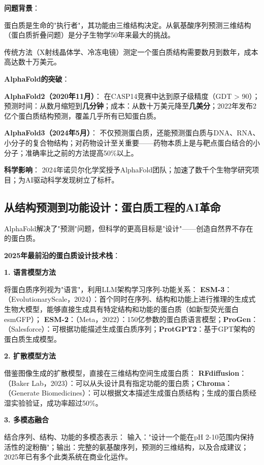 \textbf{问题背景}：

蛋白质是生命的"执行者"，其功能由三维结构决定。从氨基酸序列预测三维结构（蛋白质折叠问题）是分子生物学50年来最大的挑战。

传统方法（X射线晶体学、冷冻电镜）测定一个蛋白质结构需要数月到数年，成本高达数十万美元。

\textbf{AlphaFold的突破}：

\textbf{AlphaFold2（2020年11月）}\cite{jumper2021highly}：
在CASP14竞赛中达到原子级精度（GDT > 90）；预测时间：从数月缩短到\textbf{几分钟}；成本：从数十万美元降至\textbf{几美分}；2022年发布2亿个蛋白质结构预测，覆盖几乎所有已知蛋白质。

\textbf{AlphaFold3（2024年5月）}：
不仅预测蛋白质，还能预测蛋白质与DNA、RNA、小分子的复合物结构；对药物设计至关重要——药物本质上是与靶点蛋白结合的小分子；准确率比之前的方法提高50\%以上。

\textbf{科学影响}：
2024年诺贝尔化学奖授予AlphaFold团队；加速了数千个生物学研究项目；为AI驱动科学发现树立了标杆。

\subsection{从结构预测到功能设计：蛋白质工程的AI革命}

AlphaFold解决了"预测"问题，但科学的更高目标是"设计"——创造自然界不存在的蛋白质。

\textbf{2025年最前沿的蛋白质设计技术栈}：

\textbf{1. 语言模型方法}

将蛋白质序列视为"语言"，利用LLM架构学习序列-功能关系：
\textbf{ESM-3}：\allowbreak （EvolutionaryScale，2024）：首个同时在序列、结构和功能上进行推理的生成式生物大模型，能够直接生成具有特定结构和功能的蛋白质（如新型荧光蛋白esmGFP）；\allowbreak
\textbf{ESM-2}：\allowbreak （Meta，2022）：150亿参数的蛋白质语言模型；\allowbreak \textbf{ProGen}：\allowbreak （Salesforce）：可根据功能描述生成蛋白质序列；\allowbreak \textbf{ProtGPT2}：基于GPT架构的蛋白质生成模型。

\textbf{2. 扩散模型方法}

借鉴图像生成的扩散模型，直接在三维结构空间生成蛋白质：
\textbf{RFdiffusion}：\allowbreak （Baker Lab，2023）：可以从头设计具有指定功能的蛋白质；\allowbreak \textbf{Chroma}：\allowbreak （Generate Biomedicines）：可以根据文本描述生成蛋白质结构；生成的蛋白质经湿实验验证，成功率超过50\%。

\textbf{3. 多模态融合}

结合序列、结构、功能的多模态表示：
输入："设计一个能在pH 2-10范围内保持活性的淀粉酶"；输出：完整的氨基酸序列，预测的三维结构，以及合成建议；2025年已有多个此类系统在商业化运作。

